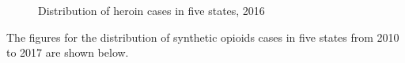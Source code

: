 \documentclass{mcmthesis}
\numberwithin{equation}{section}
\numberwithin{figure}{section}
\numberwithin{table}{section}
\theoremstyle{mydef}
\begin{document}
\begin{appendices}
\begin{figure}[H]
\end{figure}
\begin{figure}[H]
  \caption{Distribution of heroin cases in five states, 2016}\label{fighe16}
\end{figure}

The figures for the distribution of synthetic opioids cases in five states from 2010 to 2017 are shown below.


\end{appendices}
\end{document}
